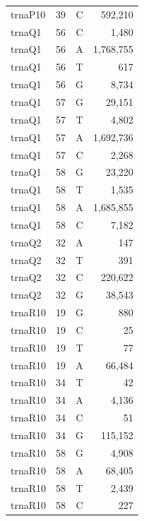 \documentclass[12pt]{rockefeller}
\begin{document}
{\begin{center}
\begin{supertabular}{|l|r|c|r|}
 trnaP10 &        39 &          C &    592,210 \\
  trnaQ1 &        56 &          C &      1,480 \\
  trnaQ1 &        56 &          A &  1,768,755 \\
  trnaQ1 &        56 &          T &        617 \\
  trnaQ1 &        56 &          G &      8,734 \\
  trnaQ1 &        57 &          G &     29,151 \\
  trnaQ1 &        57 &          T &      4,802 \\
  trnaQ1 &        57 &          A &  1,692,736 \\
  trnaQ1 &        57 &          C &      2,268 \\
  trnaQ1 &        58 &          G &     23,220 \\
  trnaQ1 &        58 &          T &      1,535 \\
  trnaQ1 &        58 &          A &  1,685,855 \\
  trnaQ1 &        58 &          C &      7,182 \\
  trnaQ2 &        32 &          A &        147 \\
  trnaQ2 &        32 &          T &        391 \\
  trnaQ2 &        32 &          C &    220,622 \\
  trnaQ2 &        32 &          G &     38,543 \\
 trnaR10 &        19 &          G &        880 \\
 trnaR10 &        19 &          C &         25 \\
 trnaR10 &        19 &          T &         77 \\
 trnaR10 &        19 &          A &     66,484 \\
 trnaR10 &        34 &          T &         42 \\
 trnaR10 &        34 &          A &      4,136 \\
 trnaR10 &        34 &          C &         51 \\
 trnaR10 &        34 &          G &    115,152 \\
 trnaR10 &        58 &          G &      4,908 \\
 trnaR10 &        58 &          A &     68,405 \\
 trnaR10 &        58 &          T &      2,439 \\
 trnaR10 &        58 &          C &        227 \\

\end{supertabular}
\end{center}}
\end{document}
